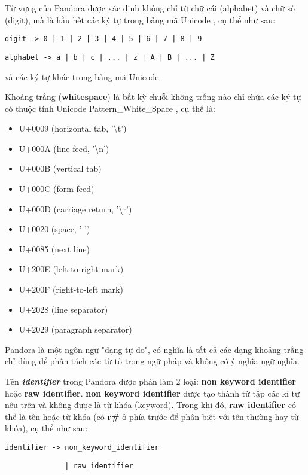 

    Từ vựng của Pandora được xác định không chỉ từ chữ cái (alphabet) và chữ số (digit), mà là hầu hết các ký tự trong bảng mã Unicode \cite{allen2012unicode}, cụ thể như sau:

    \verb/digit -> 0 | 1 | 2 | 3 | 4 | 5 | 6 | 7 | 8 | 9/

    \verb/alphabet -> a | b | c | ... | z | A | B | ... | Z/

\noindent và các ký tự khác trong bảng mã Unicode.

    Khoảng trắng (\textbf{whitespace}) là bất kỳ chuỗi không trống nào chỉ chứa các ký tự có thuộc tính Unicode Pattern\_White\_Space \cite{web:unicode:report}, cụ thể là:
    \begin{itemize}
        \item{U+0009 (horizontal tab, '\textbackslash t')}
        \item{U+000A (line feed, '\textbackslash n')}
        \item{U+000B (vertical tab)}
        \item{U+000C (form feed)}
        \item{U+000D (carriage return, '\textbackslash r')}
        \item{U+0020 (space, ' ')}
        \item{U+0085 (next line)}
        \item{U+200E (left-to-right mark)}
        \item{U+200F (right-to-left mark)}
        \item{U+2028 (line separator)}
        \item{U+2029 (paragraph separator)}
    \end{itemize}
\noindent Pandora là một ngôn ngữ "dạng tự do", có nghĩa là tất cả các dạng khoảng trắng chỉ dùng để phân tách các từ tố trong ngữ pháp và không có ý nghĩa ngữ nghĩa.

    Tên \textbf{\textit{identifier}} trong Pandora được phân làm 2 loại: \textbf{non keyword identifier} hoặc \textbf{raw identifier}. \textbf{non keyword identifier} được tạo thành từ tập các kí tự nêu trên và không được là từ khóa (keyword). Trong khi đó, \textbf{raw identifier} có thể là tên hoặc từ khóa (có \textbf{r\#} ở phía trước để phân biệt với tên thường hay từ khóa), cụ thể như sau:

    \verb/identifier -> non_keyword_identifier/

    \verb/              | raw_identifier/

